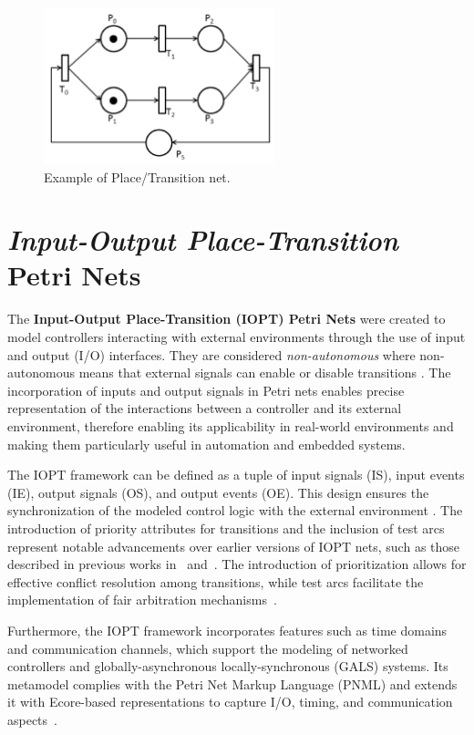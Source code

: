 \begin{figure}[htbp]
  \centering
  \includegraphics[width=0.6\textwidth]{Chapters/Figures/petriNetExemplo.jpg}
  \caption{Example of Place/Transition net.}
  \label{fig:petrinet}
\end{figure}

\section{\emph{Input-Output Place-Transition} Petri Nets}
\label{sec:iopt_petri_nets}


The \textbf{Input-Output Place-Transition (IOPT) Petri Nets} were created to model controllers interacting with external environments through the use of input and output (I/O) interfaces\cite{iopttools}. They are considered \emph{non-autonomous}  where non-autonomous means that external signals can enable or disable transitions \cite{2015gomes}. The incorporation of inputs and output signals in Petri nets enables precise representation of the interactions between a controller and its external environment, therefore enabling its applicability in real-world environments  and making them particularly useful in automation and embedded systems\cite{iopttools}.


The IOPT framework can be defined as a tuple of input signals (IS), input events (IE), output signals (OS), and output events (OE). This design ensures the synchronization of the modeled control logic with the external environment \cite{iopttools}. The introduction of priority attributes for transitions and the inclusion of test arcs represent notable advancements over earlier versions of IOPT nets, such as those described in previous works in~\cite{barros2004} and~\cite{bg2005}. The introduction of prioritization allows for effective conflict resolution among transitions, while test arcs facilitate the implementation of fair arbitration mechanisms~\cite{conflict}.

Furthermore, the IOPT framework incorporates features such as time domains and communication channels, which support the modeling of networked controllers and globally-asynchronous locally-synchronous (GALS) systems. Its metamodel complies with the Petri Net Markup Language (PNML) and extends it with Ecore-based representations to capture I/O, timing, and communication aspects~\cite{iopttools}.


